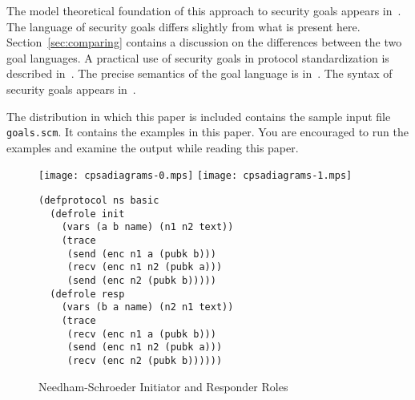 \documentclass[12pt]{article}
\begin{document}
The model theoretical foundation of this approach to security goals
appears in~\cite{Guttman14}.  The language of security goals differs
slightly from what is present here.  Section~\ref{sec:comparing}
contains a discussion on the differences between the two goal
languages.  A practical use of security goals in protocol
standardization is described in~\cite{GuttmanLiskovRowe14}.  The
precise semantics of the goal language is in~\cite{cpsaspec09}.  The
syntax of security goals appears in~\cite[Table~2]{cpsaprimer09}.

The distribution in which this paper is included contains the sample
input {\cpsa} file \texttt{goals.scm}.  It contains the examples in
this paper.  You are encouraged to run the examples and examine the
output while reading this paper.


\begin{figure}
\begin{center}
\texttt{[image: cpsadiagrams-0.mps]}\hfil
\texttt{[image: cpsadiagrams-1.mps]}\\
\end{center}
\begin{center}
\begin{minipage}{3in}
\begin{verbatim}
(defprotocol ns basic
  (defrole init
    (vars (a b name) (n1 n2 text))
    (trace
     (send (enc n1 a (pubk b)))
     (recv (enc n1 n2 (pubk a)))
     (send (enc n2 (pubk b)))))
  (defrole resp
    (vars (b a name) (n2 n1 text))
    (trace
     (recv (enc n1 a (pubk b)))
     (send (enc n1 n2 (pubk a)))
     (recv (enc n2 (pubk b))))))
\end{verbatim}
\end{minipage}
\end{center}
\caption{Needham-Schroeder Initiator and Responder Roles}
\label{fig:ns roles}
\end{figure}
\end{document}
